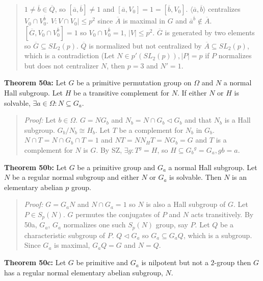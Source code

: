 \begin{quote}
$1 \neq {\overline b} \in {\overline Q}$, so $[{\overline a}, {\overline b}] \neq 1$ and
$[{\overline a}, V_0] = 1 = [{\overline b}, V_0]$.  $ \langle {\overline a}, {\overline b} \rangle$ centralizes
$V_0 \cap V_0^{\overline b}$.  $V: V \cap V_0| \leq p^2$ since ${\overline A}$ is maximal in $G$ and
${\overline a}^{\overline b} \notin {\overline A}$. $[{\overline G}, V_0 \cap V_0^{\overline b}] = 1$ so
$V_0 \cap V_0^{\overline b} = 1$, $|V| \leq p^2$.  ${\overline G}$ is generated by two elements so
${\overline G} \subseteq SL_2(p)$.  ${\overline Q}$ is normalized but not centralized by ${\overline A} \subseteq SL_2(p)$, which is a contradiction (Let $N \in p'(SL_2(p)), |P|= p$ if
$P$ normalizes but does not centralizer $N$, then $p=3$ and $N'=1$.
\end{quote}
{\bf Theorem 50a:} Let $G$ be a primitive permutation group on $\Omega$ and $N$ a normal Hall subgroup.  Let $H$ be a transitive complement for $N$.
If either $N$ or $H$ is solvable, $\exists a \in \Omega: N \subseteq G_a$.
\begin{quote}
\emph{Proof:}
Let $b \in \Omega$.  $G= NG_b$ and $N_b = N \cap G_b \lhd G_b$ and that $N_b$ is a Hall subgroup.  $G_b/N_b \cong H_b$.
Let $T$ be a complement for $N_b$ in $G_b$.  $N \cap T = N \cap G_b \cap T =1$ and $NT= N N_H T = N G_b = G$ and
$T$ is a complement for $N$ is $G$.  By SZ, $\exists g: T^g=H$, so $H \subseteq {G_b}^g = G_a, gb=a$.
\end{quote}
{\bf Theorem 50b:}  Let $G$ be a primitive group and $G_a$ a normal Hall subgroup.  Let $N$ be a regular normal subgroup
and either $N$ or $G_a$ is solvable.  Then $N$ is an elementary abelian $p$ group.
\begin{quote}
\emph{Proof:}
$G= G_aN$ and $N \cap G_a = 1$ so $N$ is also a Hall subgroup of $G$.  Let $P \in S_p(N)$.  $G$ permutes the conjugates
of $P$ and $N$ acts transitively.  By 50a, $G_a$, $G_a$ normalizes one such $S_p(N)$ group, say $P$.  Let $Q$ be a characteristic
subgroup of $P$.  $Q \lhd G_a$ so $G_a \subseteq G_aQ$, which is a subgroup.  Since $G_a$ is maximal, $G_aQ = G$ and $N=Q$.
\end{quote}
{\bf Theorem 50c:} Let $G$ be primitive and $G_a$ is nilpotent but not a $2$-group then $G$ has a regular
normal elementary abelian subgroup, $N$.
